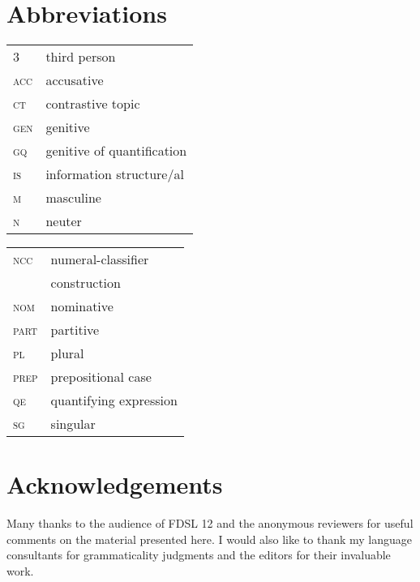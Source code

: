 \documentclass[output=paper,
modfonts,
newtxmath,
hidelinks
]{langscibook}
\begin{document}
\section*{Abbreviations}

\begin{tabularx}{.5\textwidth}{@{}lQ@{}}
\textsc{3}&third person\\
\textsc{acc}&accusative\\
\textsc{ct}&contrastive topic\\
\textsc{gen}&genitive\\
\textsc{gq}&genitive of quantification\\
\textsc{is}&information structure/al\\
\textsc{m}&masculine\\
\textsc{n}&neuter\\
\end{tabularx}%
\begin{tabularx}{.5\textwidth}{@{}lQ@{}}
\textsc{ncc}&numeral-classifier\\
&construction\\
\textsc{nom}&nominative\\
\textsc{part}&partitive\\
\textsc{pl}&plural\\
\textsc{prep}&prepositional case\\
\textsc{qe}&quantifying expression\\
\textsc{sg}&singular\\
\end{tabularx}

\section*{Acknowledgements}

Many thanks to the audience of FDSL 12 and the anonymous reviewers for useful comments on the material presented here. I would also like to thank my language consultants for grammaticality judgments and the editors for their invaluable work.

\sloppy
\printbibliography[heading=subbibliography,notkeyword=this]
\end{document}
